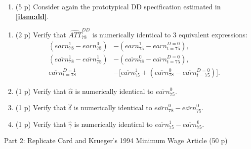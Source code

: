 \documentclass[
]{article}
\providecommand{\tightlist}{%
  \setlength{\itemsep}{0pt}\setlength{\parskip}{0pt}}
\begin{document}
\begin{enumerate}
\def\labelenumi{\arabic{enumi}.}
\setcounter{enumi}{6}
\tightlist
\item
  (5 p) Consider again the prototypical DD specification estimated in
  \textbf{\ref{item:dd}}.
\end{enumerate}

\begin{enumerate}
\def\labelenumi{\alph{enumi}.}
\tightlist
\item
  (2 p) Verify that \(\widehat{ATT}_{78}^{DD}\) is numerically identical
  to 3 equivalent expressions:\label{item:DinD-diff} \begin{align}
      \left( \overline{earn}_{78}^{1}-\overline{earn}_{78}^{0}\right) &-\left( \overline{earn}_{75}^{1}-\overline{earn}_{t=75}^{D=0}\right),\label{eq:DDv1} \\
      \left( \overline{earn}_{78}^{1} -\overline{earn}_{75}^{1}\right) &-\left( \overline{earn}_{78}^{0}-\overline{earn}_{t=75}^{D=0}\right),\label{eq:DDv2} \\ 
      \overline{earn}_{t=78}^{D=1} &- \big[ \overline{earn}_{75}^{1}+ \left( \overline{earn}_{78}^{0}-\overline{earn}_{t=75}^{D=0}\right) \big].\label{eq:DDv3}
      \end{align}
\item
  (1 p) Verify that \(\hat{\alpha}\) is numerically identical to
  \(\overline{earn}_{75}^{0}\).
\item
  (1 p) Verify that \(\hat{\delta}\) is numerically identical to
  \(\overline{earn}_{78}^{0}-\overline{earn}_{75}^{0}\).
\item
  (1 p) Verify that \(\hat{\gamma}\) is numerically identical to
  \(\overline{earn}_{75}^{1}-\overline{earn}_{75}^{0}\).
\end{enumerate}

\newpage

\begin{center}
{\LARGE Part 2: Replicate Card and Krueger's 1994 Minimum Wage Article (50 p)}
\end{center}
\end{document}
